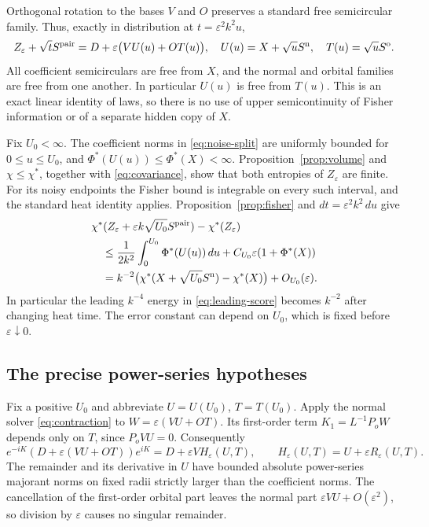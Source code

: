 \documentclass[11pt]{article}
\theoremstyle{definition}\newtheorem{definition}[theorem]{Definition}
\theoremstyle{remark}\newtheorem{remark}[theorem]{Remark}
\newcommand{\eps}{\varepsilon}\newcommand{\id}{\mathrm{id}}
\begin{document}
Orthogonal rotation to the bases $V$ and $O$ preserves a standard free
semicircular family. Thus, exactly in distribution at
$t=\eps^2k^2u$,
\begin{equation}\label{eq:noise-split}
 Z_\eps+\sqrt t S^{\rm pair}
 =D+\eps\big(VU(u)+OT(u)\big),\quad
 U(u)=X+\sqrt u S^{\rm n},\quad T(u)=\sqrt u S^{\rm o}.
\end{equation}
All coefficient semicirculars are free from $X$, and the normal and
orbital families are free from one another. In particular $U(u)$ is
free from $T(u)$. This is an exact linear identity of laws, so there is
no use of upper semicontinuity of Fisher information or of a separate
hidden copy of $X$.

Fix $U_0<\infty$. The coefficient norms in \eqref{eq:noise-split} are
uniformly bounded for $0\leq u\leq U_0$, and
$\Phi^*(U(u))\leq\Phi^*(X)<\infty$. Proposition~\ref{prop:volume}
and $\chi\leq\chi^*$, together with \eqref{eq:covariance}, show that
both entropies of $Z_\eps$ are finite. For its noisy endpoints the
Fisher bound is integrable on every such interval, and the standard
heat identity applies. Proposition~\ref{prop:fisher} and
$dt=\eps^2k^2\,du$ give
\begin{align}
 &\chi^*(Z_\eps+\eps k\sqrt{U_0}S^{\rm pair})-\chi^*(Z_\eps)
 \notag\\
 &\quad\leq\frac1{2k^2}\int_0^{U_0}\Phi^*(U(u))\,du
                +C_{U_0}\eps(1+\Phi^*(X))\notag\\
 &\quad=k^{-2}\big(\chi^*(X+\sqrt{U_0}S^{\rm n})-\chi^*(X)\big)
                +O_{U_0}(\eps).
 \label{eq:star-increment}
\end{align}
In particular the leading $k^{-4}$ energy in
\eqref{eq:leading-score} becomes $k^{-2}$ after changing heat time.
The error constant can depend on $U_0$, which is fixed before
$\eps\downarrow0$.

\subsection{The precise power-series hypotheses}
\label{sec:straighten}
Fix a positive $U_0$ and abbreviate $U=U(U_0)$, $T=T(U_0)$.
Apply the normal solver \eqref{eq:contraction} to
$W=\eps(VU+OT)$. Its first-order term $K_1=L^{-1}P_oW$ depends only
on $T$, since $P_oVU=0$. Consequently
\begin{equation}\label{eq:straighten}
 e^{-iK}(D+\eps(VU+OT))e^{iK}
 =D+\eps V H_\eps(U,T),\qquad
 H_\eps(U,T)=U+\eps R_\eps(U,T).
\end{equation}
The remainder and its derivative in $U$ have bounded absolute
power-series majorant norms on fixed radii strictly larger than the
coefficient norms. The cancellation of the first-order orbital part
leaves the normal part $\eps VU+O(\eps^2)$, so division by $\eps$
causes no singular remainder.
\end{document}
